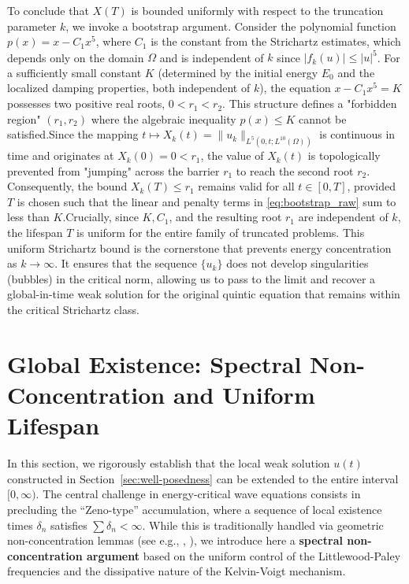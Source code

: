 \documentclass[11pt,letterpaper]{amsart}
\begin{document}
To conclude that $X(T)$ is bounded uniformly with respect to the truncation parameter $k$, we invoke a bootstrap argument. Consider the polynomial function $p(x) = x - C_1 x^5$, where $C_1$ is the constant from the Strichartz estimates, which depends only on the domain $\Omega$ and is independent of $k$ since $|f_k(u)| \le |u|^5$. For a sufficiently small constant $K$ (determined by the initial energy $E_0$ and the localized damping properties, both independent of $k$), the equation $x - C_1 x^5 = K$ possesses two positive real roots, $0 < r_1 < r_2$. This structure defines a "forbidden region" $(r_1, r_2)$ where the algebraic inequality $p(x) \le K$ cannot be satisfied.Since the mapping $t \mapsto X_k(t) = \|u_k\|_{L^5(0,t; L^{10}(\Omega))}$ is continuous in time and originates at $X_k(0) = 0 < r_1$, the value of $X_k(t)$ is topologically prevented from "jumping" across the barrier $r_1$ to reach the second root $r_2$. Consequently, the bound $X_k(T) \le r_1$ remains valid for all $t \in [0, T]$, provided $T$ is chosen such that the linear and penalty terms in \eqref{eq:bootstrap_raw} sum to less than $K$.Crucially, since $K, C_1$, and the resulting root $r_1$ are independent of $k$, the lifespan $T$ is uniform for the entire family of truncated problems. This uniform Strichartz bound is the cornerstone that prevents energy concentration as $k \to \infty$. It ensures that the sequence $\{u_k\}$ does not develop singularities (bubbles) in the critical norm, allowing us to pass to the limit and recover a global-in-time weak solution for the original quintic equation that remains within the critical Strichartz class.

\section{Global Existence: Spectral Non-Concentration and Uniform Lifespan}
\label{sec:global}

In this section, we rigorously establish that the local weak solution $u(t)$ constructed in Section~\ref{sec:well-posedness} can be extended to the entire interval $[0, \infty)$. The central challenge in energy-critical wave equations consists in precluding the ``Zeno-type'' accumulation, where a sequence of local existence times $\delta_n$ satisfies $\sum \delta_n < \infty$. While this is traditionally handled via geometric non-concentration lemmas (see e.g., \cite{BurqLebeauPlanchon}, \cite{BahouriGerard, KenigMerle}), we introduce here a \textbf{spectral non-concentration argument} based on the uniform control of the Littlewood-Paley frequencies and the dissipative nature of the Kelvin-Voigt mechanism.
\end{document}

